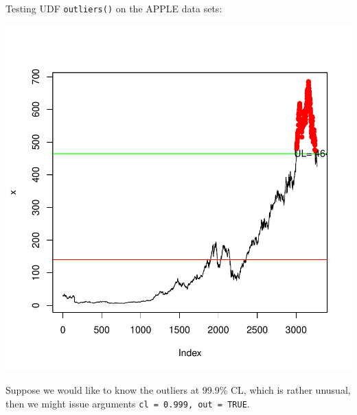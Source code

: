 \documentclass{article}
\begin{document}
Testing UDF \texttt{outliers()} on the APPLE data sets:

\begin{Schunk}
\end{Schunk}
\includegraphics{anadetect-009}

Suppose we would like to know the outliers at 99.9\% CL, which is rather unusual, then we might issue arguments \texttt{cl = 0.999, out = TRUE}.
\end{document}
